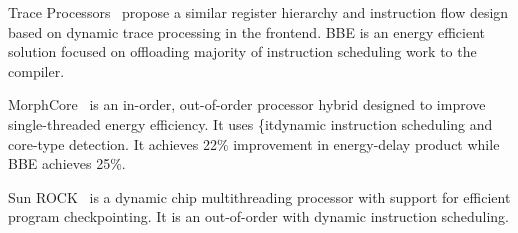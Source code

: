 Trace Processors~\cite{trace} propose a similar register hierarchy and
instruction flow design based on dynamic trace processing in the frontend. BBE
is an energy efficient solution focused on offloading majority of instruction
scheduling work to the compiler.

MorphCore~\cite{morphcore} is an in-order, out-of-order processor hybrid
designed to improve single-threaded energy efficiency. It uses {\{it{dynamic}}
instruction scheduling and core-type detection. It achieves 22\% improvement in
energy-delay product while BBE achieves 25\%.

Sun ROCK~\cite{rock} is a dynamic chip multithreading processor with support for
efficient program checkpointing. It is an out-of-order with dynamic instruction
scheduling.

